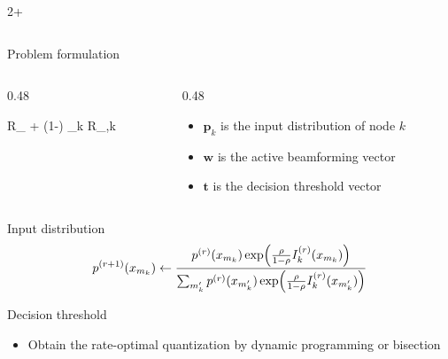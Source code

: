 \documentclass[final,xcolor={table}]{beamer}
\newlength{\sepwidth}
\newlength{\colwidth}
\begin{document}
\begin{frame}[t]
\begin{columns}[t]
\begin{column}{2\colwidth+\sepwidth}
\begin{columns}[t,totalwidth=\textwidth]
\begin{column}{\colwidth}
					\begin{block}{Problem formulation}
						\vspace{-0.5cm}
						\begin{columns}[c,totalwidth=\textwidth]
							\begin{column}{0.48\colwidth}
								\begin{maxi*}
									{}{\rho R_ + (1-\rho) \sum_k R_{,k}}{}{}
								\end{maxi*}
							\end{column}
							\begin{column}{0.48\colwidth}
								\begin{itemize}\setlength\itemsep{20pt}
									\item $\boldsymbol{p}_k$ is the input distribution of node $k$
									\item $\boldsymbol{w}$ is the active beamforming vector
									\item $\boldsymbol{t}$ is the decision threshold vector
								\end{itemize}
							\end{column}
						\end{columns}
					\end{block}

					\begin{thm}{Input distribution}{}
						\begin{equation*}
							p^{(r+1)}(x_{m_k}) \gets \frac{p^{(r)}(x_{m_k}) \exp \Bigl( \frac{\rho}{1 - \rho} I_k^{(r)}(x_{m_k}) \Bigr)}{\sum_{m_k'} p^{(r)}(x_{m_k'}) \exp \Bigl( \frac{\rho}{1 - \rho} I_k^{(r)}(x_{m_k'}) \Bigr)}
							\label{eq:input_kkt_solution}
						\end{equation*}
					\end{thm}

					\begin{thm}{Decision threshold}{}
						\begin{figure}[!t]
							\centering
							\resizebox{0.65\linewidth}{!}{
								
							}
						\end{figure}
						\begin{itemize}\setlength\itemsep{15pt}
							\item Obtain the rate-optimal quantization by dynamic programming or bisection
						\end{itemize}
					\end{thm}


\end{column}
\end{columns}
\end{column}
\end{columns}
\end{frame}
\end{document}
